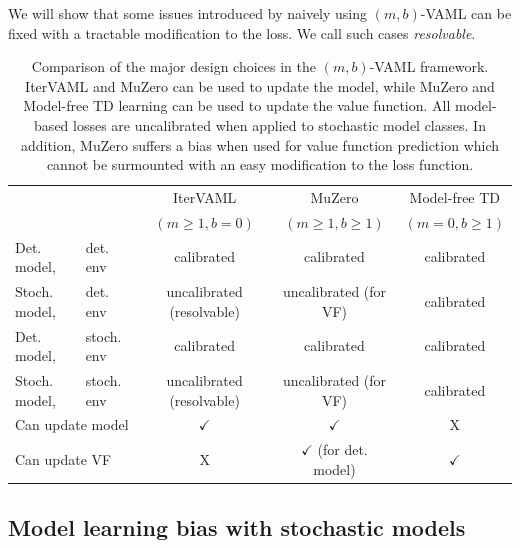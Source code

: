 We will show that some issues introduced by naively using $(m,b)$-VAML can be fixed with a tractable modification to the loss.
We call such cases \emph{resolvable}.


\begin{table}
    {\footnotesize
    \begin{center}
        \begin{tabular}{l l|c|c|c}
            && IterVAML &  MuZero &  Model-free TD \\
            && {$(m\geq1,b=0)$} &  $(m\geq1,b\geq1)$& $(m=0,b\geq1)$\\\hline
            Det. model,& det. env & {\color{newbluedeal} calibrated} & {\color{newbluedeal} calibrated} & {\color{newbluedeal} calibrated} \\
            Stoch. model,& det. env & {\color{newgreendeal} uncalibrated (resolvable)} & {\color{uoftred} uncalibrated (for VF)} & {\color{newbluedeal} calibrated}\\
            Det. model,& stoch. env & {\color{newbluedeal} calibrated} & {\color{newbluedeal} calibrated}  & {\color{newbluedeal} calibrated} \\
            Stoch. model,& stoch. env & {\color{newgreendeal} uncalibrated (resolvable)} & {\color{uoftred} uncalibrated (for VF)} & {\color{newbluedeal} calibrated} \\\hline
            \multicolumn{2}{l|}{Can update model} & {\color{newbluedeal} $\checkmark$} & {\color{newbluedeal} $\checkmark$}& \color{uoftred} X \\
            \multicolumn{2}{l|}{Can update VF}   & \color{uoftred} X & {\color{newgreendeal} $\checkmark$ (for det. model)}  & {\color{newbluedeal} $\checkmark$}
        \end{tabular}
    \end{center}
    }
    \caption{Comparison of the major design choices in the $(m,b)$-VAML framework. IterVAML and MuZero can be used to update the model, while MuZero and Model-free TD learning can be used to update the value function. All model-based losses are uncalibrated when applied to stochastic model classes. In addition, MuZero suffers a bias when used for value function prediction which cannot be surmounted with an easy modification to the loss function.}
    \label{tab:cvaml:bias_overview}
\end{table}

\subsection{Model learning bias with stochastic models}

